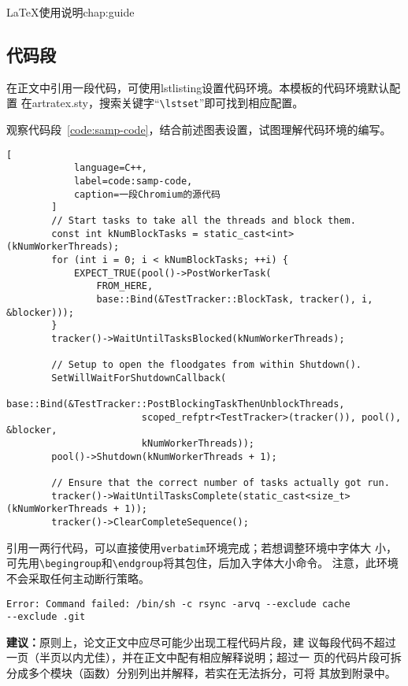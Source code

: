 \begin{cuzchapter}{\LaTeX{}使用说明}{chap:guide}
	\subsection{代码段}\label{sub:listings}

	在正文中引用一段代码，可使用lstlisting设置代码环境。本模板的代码环境默认配置
	在artratex.sty，搜索关键字“\verb|\lstset|”即可找到相应配置。

	观察代码段~\ref{code:samp-code}，结合前述图表设置，试图理解代码环境的编写。

	\begin{lstlisting}[
            language=C++,
            label=code:samp-code,
            caption=一段Chromium的源代码
        ]
        // Start tasks to take all the threads and block them.
        const int kNumBlockTasks = static_cast<int>(kNumWorkerThreads);
        for (int i = 0; i < kNumBlockTasks; ++i) {
            EXPECT_TRUE(pool()->PostWorkerTask(
                FROM_HERE,
                base::Bind(&TestTracker::BlockTask, tracker(), i, &blocker)));
        }
        tracker()->WaitUntilTasksBlocked(kNumWorkerThreads);

        // Setup to open the floodgates from within Shutdown().
        SetWillWaitForShutdownCallback(
            base::Bind(&TestTracker::PostBlockingTaskThenUnblockThreads,
                        scoped_refptr<TestTracker>(tracker()), pool(), &blocker,
                        kNumWorkerThreads));
        pool()->Shutdown(kNumWorkerThreads + 1);

        // Ensure that the correct number of tasks actually got run.
        tracker()->WaitUntilTasksComplete(static_cast<size_t>(kNumWorkerThreads + 1));
        tracker()->ClearCompleteSequence();
    \end{lstlisting}

	引用一两行代码，可以直接使用\texttt{verbatim}环境完成；若想调整环境中字体大
	小，可先用\verb|\begingroup|和\verb|\endgroup|将其包住，后加入字体大小命令。
	注意，此环境不会采取任何主动断行策略。

	\begingroup
	\small
	\begin{verbatim}
Error: Command failed: /bin/sh -c rsync -arvq --exclude cache
--exclude .git 
    \end{verbatim}
	\endgroup

	\begin{leftbar}
		\noindent\textbf{建议：}原则上，论文正文中应尽可能少出现工程代码片段，建
		议每段代码不超过一页（半页以内尤佳），并在正文中配有相应解释说明；超过一
		页的代码片段可拆分成多个模块（函数）分别列出并解释，若实在无法拆分，可将
		其放到附录中。
	\end{leftbar}


\end{cuzchapter}
